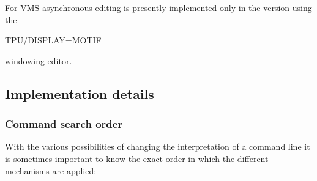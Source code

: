 For VMS asynchronous editing is presently implemented only in the
\Motif{} version using the 
\begin{XMP}
TPU/DISPLAY=MOTIF
\end{XMP} 
windowing editor.


\subsection{Implementation details}


\subsubsection{Command search order}

With the various possibilities of changing the interpretation of
a command line 
it is sometimes important to know the exact order in which the
different mechanisms are applied:
